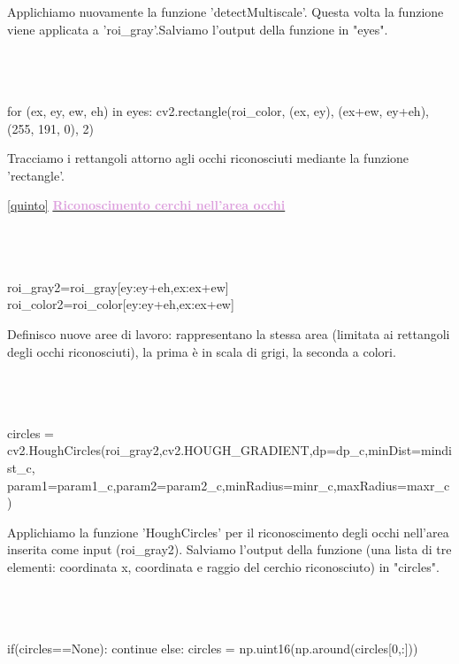 \documentclass[12pt]{article}
\begin{document}
{  
  Applichiamo nuovamente la funzione 'detectMultiscale'. Questa volta la funzione viene applicata a 'roi\_gray'.Salviamo l'output della funzione in "eyes".
  	\\
  	\\
  	\\
  	\\
 \begin{codice}
            for (ex, ey, ew, eh) in eyes:
                cv2.rectangle(roi_color, (ex, ey), (ex+ew, ey+eh), (255, 191, 0), 2)
\end{codice}
\vspace{1cm}
 
   	Tracciamo i rettangoli attorno agli occhi riconosciuti mediante la funzione 'rectangle'.
\vspace{1.5cm}
  	 	
 \ref {quinto} \underline{\textbf{\textcolor{Plum}{Riconoscimento cerchi nell'area occhi}}}
  	\\
  	\\
  	\\
  	\\
 \begin{codice}
                roi_gray2=roi_gray[ey:ey+eh,ex:ex+ew]
                roi_color2=roi_color[ey:ey+eh,ex:ex+ew]

\end{codice}
\vspace{1cm} 	
 
 
   	Definisco nuove aree di lavoro: rappresentano la stessa area (limitata ai rettangoli degli occhi riconosciuti), la prima è in scala di grigi, la seconda a colori.
  	\\
  	\\
  	\\
  	\\
\begin{codice}
                circles = cv2.HoughCircles(roi_gray2,cv2.HOUGH_GRADIENT,dp=dp_c,minDist=mindist_c,
                            param1=param1_c,param2=param2_c,minRadius=minr_c,maxRadius=maxr_c)

\end{codice}
\vspace{1cm}

	 Applichiamo la funzione 'HoughCircles' per il riconoscimento degli occhi nell'area inserita come input (roi\_gray2). Salviamo l'output della funzione (una lista di tre elementi: coordinata x, coordinata  e raggio del cerchio riconosciuto) in "circles".
  	\\
  	\\
  	\\
  	\\
\begin{codice}
                if(circles==None):
                    continue
                else:
                     circles = np.uint16(np.around(circles[0,:]))
\end{codice}
\vspace{1cm}

}
\end{document}
